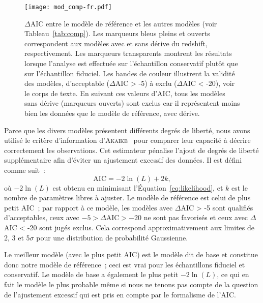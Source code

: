 \documentclass[../main/main.tex]{subfiles}
\begin{document}
\begin{figure}[ht]
    \texttt{[image: mod\_comp-fr.pdf]}
    \caption[$\Delta$AIC entre le modèle de base et les autres
    modèles]{$\Delta$AIC entre le modèle de référence et les autres
        modèles (voir Tableau~\ref{tab:comp}). Les marqueurs bleus pleins et
        ouverts correspondent aux modèles avec et sans dérive du redshift,
        respectivement. Les marqueurs transparents montrent les résultats
        lorsque l'analyse est effectuée sur l'échantillon conservatif plutôt que
        sur l'échantillon fiduciel. Les bandes de couleur illustrent la validité
        des modèles, d'acceptable ($\Delta$AIC > -5) à exclu ($\Delta$AIC <
        -20), voir le corps de texte. En suivant ces valeurs d'AIC, tous les
        modèles sans dérive (marqueurs ouverts) sont exclus car il représentent
    moins bien les données que le modèle de référence, avec dérive.}
    \label{fig:mod_comp}
\end{figure}

Parce que les divers modèles présentent différents degrés de liberté, nous avons
utilisé le critère d'information d'\textsc{Akaike}~\citep[AIC, voir par
exemple][]{burnham2004} pour comparer leur capacité à décrire correctement les
observations. Cet estimateur pénalise l'ajout de degrés de liberté
supplémentaire afin d'éviter un ajustement excessif des données. Il est défini
comme suit~:
\begin{equation}\label{eq:aic}
    \mathrm{AIC} = -2\ln(L) + 2k,
\end{equation}
où $-2\ln(L)$ est obtenu en minimisant l'Équation~\ref{eq:likelihood}, et $k$
est le nombre de paramètres libres à ajuster. Le modèle de référence est celui
de plus petit AIC~; par rapport à ce modèle, les modèles avec $\Delta$AIC > -5
sont qualifiés d'acceptables, ceux avec $-5 > \Delta\mathrm{AIC} > -20$ ne sont
pas favorisés et ceux avec $\Delta$AIC < -20 sont jugés exclus. Cela correspond
approximativement aux limites de 2, 3 et 5$\sigma$ pour une distribution de
probabilité Gaussienne.

Le meilleur modèle (avec le plus petit AIC) est le modèle dit de base et
constitue donc notre modèle de référence~; ceci est vrai pour les échantillons
fiduciel et conservatif. Le modèle de base a également le plus petit $-2\ln(L)$,
ce qui en fait le modèle le plus probable même si nous ne tenons pas compte de
la question de l'ajustement excessif qui est pris en compte par le formalisme de
l'AIC.
\end{document}
